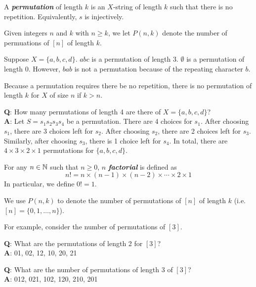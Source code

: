 \begin{definition}[Permutation]
   A \textit{\textbf{permutation}} of length $k$ is an $X$-string of length $k$ such that there is no repetition. Equivalently, $s$ is injectively.

   Given integers $n$ and $k$ with $n \geq k$, we let $P(n,k)$ denote the number of permuations of $[n]$ of length $k$.
\end{definition}

\begin{example}
   Suppose $X = \{a,b,c,d\}$. $abc$ is a permutation of length 3. $\emptyset$ is a permutation of length 0. However, $bab$ is not a permutation because of the repeating character $b$.
\end{example}

\begin{remark}
   Because a permutation requires there be no repetition, there is no permutation of length $k$ for $X$ of size $n$ if $k > n$.
\end{remark}

\textbf{Q}: How many permutations of length 4 are there of $X = \{a,b,c,d\}$? \\
\textbf{A}: Let $S = s_1s_2s_3s_4$ be a permutation. There are 4 choices for $s_1$. After choosing $s_1$, there are 3 choices left for $s_2$. After choosing $s_2$, there are 2 choices left for $s_3$. Similarly, after choosing $s_3$, there is 1 choice left for $s_4$. In total, there are $4 \times 3 \times 2 \times 1$ permutations for $\{a,b,c,d\}$.

\begin{definition}[Factorial]
   For any $n \in \mathbb{N}$ such that $n \geq 0$, $n$ \textit{\textbf{factorial}} is defined as
   $$
   n! = n \times (n-1) \times (n-2) \times \cdots \times 2 \times 1
   $$
   In particular, we define $0! = 1$.
\end{definition}

We use $P(n,k)$ to denote the number of permutations of $[n]$ of length $k$ (i.e. $[n] = \{0,1,\ldots,n\}$).

For example, consider the number of permutations of $[3]$.

\textbf{Q}: What are the permutations of length 2 for $[3]$? \\
\textbf{A}: 01, 02, 12, 10, 20, 21

\textbf{Q}: What are the number of permutations of length 3 of $[3]$? \\
\textbf{A}: 012, 021, 102, 120, 210, 201

